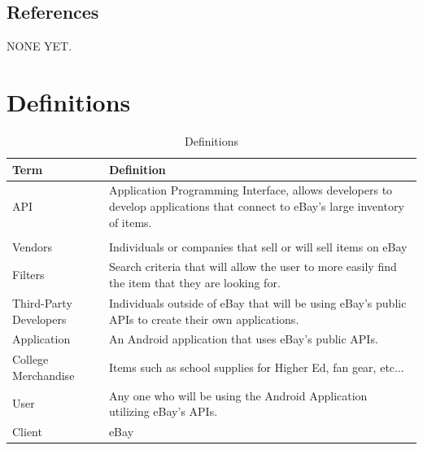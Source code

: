 \documentclass[journal,compsoc, 10pt, draftclsnofoot, onecolumn]{IEEEtran}
\begin{document}
\subsection{References}
NONE YET.

\section{Definitions}

\begin{table}[!h]
\centering
\caption{Definitions}
\label{my-label}
\begin{tabularx}{\textwidth}{l|X}
\hline
\textbf{Term}               & \textbf{Definition}                                                                                                           \\ \hline
API                    	      & Application Programming Interface, allows developers to develop applications that connect to eBay's large inventory of items. \\ \hline                                                           \\ \hline
Vendors               	      & Individuals or companies that sell or will sell items on eBay                                                                 \\ \hline
Filters                	      & Search criteria that will allow the user to more easily find the item that they are looking for.                              \\ \hline
Third-Party Developers & Individuals outside of eBay that will be using eBay's public APIs to create their own applications.                           \\ \hline
Application            	      & An Android application that uses eBay's public APIs.                                                                          \\ \hline
College Merchandise     & Items such as school supplies for Higher Ed, fan gear, etc...                                                                 \\ \hline
User                   	      & Any one who will be using the Android Application utilizing eBay's APIs.                                                      \\ \hline
Client                 	      & eBay                                                                                                                          \\ \hline

\end{tabularx}
\end{table}
\end{document}
